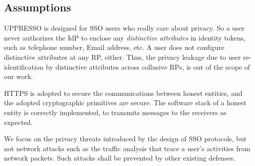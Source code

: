 
\subsection{Assumptions}
UPPRESSO is designed for SSO users who really care about privacy.
So a user never authorizes the IdP to enclose any \emph{distinctive attributes} in identity tokens,
 such as telephone number, Email address, etc.
A user does not configure  distinctive attributes at any RP, either.
Thus, the privacy leakage due to user re-identification by distinctive attributes across collusive RPs,
    is out of the scope of our work.

HTTPS is adopted to secure the communications between honest entities,
 and the adopted cryptographic primitives are secure.
The software stack of a honest entity is correctly implemented,
     to transmits messages to the receivers as expected.

We focus on the privacy threats introduced by the design of SSO protocols,
    but not network attacks such as the traffic analysis that trace a user's activities from network packets.
Such attacks shall be prevented by other existing defenses.






